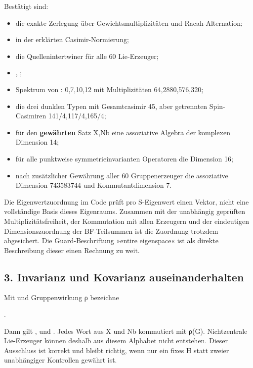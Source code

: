 Bestätigt sind:

\begin{itemize}
\tightlist
\item
  die exakte Zerlegung über Gewichtsmultiplizitäten und
  Racah-Alternation;
\item
   in der erklärten Casimir-Normierung;
\item
  die Quellenintertwiner für alle 60 Lie-Erzeuger;
\item
  , ;
\item
  Spektrum von : 0,7,10,12 mit Multiplizitäten
  64,2880,576,320;
\item
  die drei dunklen Typen mit Gesamtcasimir 45, aber getrennten
  Spin-Casimiren 141/4,117/4,165/4;
\item
  für den \textbf{gewährten} Satz X,Nb eine assoziative Algebra der
  komplexen Dimension 14;
\item
  für alle punktweise symmetrieinvarianten Operatoren die Dimension 16;
\item
  nach zusätzlicher Gewährung aller 60 Gruppenerzeuger die assoziative
  Dimension 743583744 und Kommutantdimension 7.
\end{itemize}

Die Eigenwertzuordnung im Code prüft pro S-Eigenwert einen Vektor, nicht
eine vollständige Basis dieses Eigenraums. Zusammen mit der unabhängig
geprüften Multiplizitätsfreiheit, der Kommutation mit allen Erzeugern
und der eindeutigen Dimensionszuordnung der BF-Teilsummen ist die
Zuordnung trotzdem abgesichert. Die Guard-Beschriftung »entire
eigenspace« ist als direkte Beschreibung dieser einen Rechnung zu weit.

\subsection{3. Invarianz und Kovarianz
auseinanderhalten}\label{invarianz-und-kovarianz-auseinanderhalten}

Mit  und Gruppenwirkung ρ bezeichne

.

Dann gilt ,  und
. Jedes Wort aus X und Nb kommutiert mit
ρ(G). Nichtzentrale Lie-Erzeuger können deshalb aus diesem Alphabet
nicht entstehen. Dieser Ausschluss ist korrekt und bleibt richtig, wenn
nur ein fixes H statt zweier unabhängiger Kontrollen gewährt ist.

